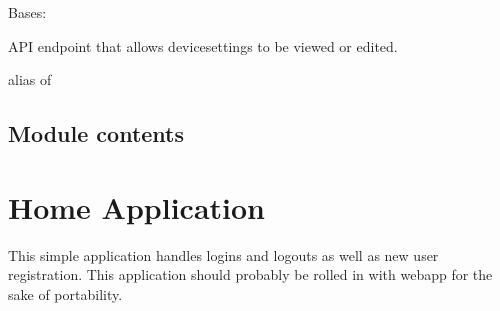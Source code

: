 \documentclass[letterpaper,10pt,english]{sphinxmanual}
\begin{document}
\begin{fulllineitems}
\label{modules/farmer:farmer.views.DeviceSettingsViewSet}
Bases: 

API endpoint that allows devicesettings to be viewed or edited.

\begin{fulllineitems}
\label{modules/farmer:farmer.views.DeviceSettingsViewSet.list}
\end{fulllineitems}


\begin{fulllineitems}
\label{modules/farmer:farmer.views.DeviceSettingsViewSet.queryset}
\end{fulllineitems}


\begin{fulllineitems}
\label{modules/farmer:farmer.views.DeviceSettingsViewSet.retrieve}
\end{fulllineitems}


\begin{fulllineitems}
\label{modules/farmer:farmer.views.DeviceSettingsViewSet.serializer_class}
alias of 

\end{fulllineitems}


\end{fulllineitems}



\subsection{Module contents}
\label{modules/farmer:module-contents}\label{modules/farmer:module-farmer}

\section{Home Application}
\label{modules/home:home-application}\label{modules/home::doc}
This simple application handles logins and logouts as well as new
user registration. This application should probably be rolled in with
webapp for the sake of portability.
\end{document}
